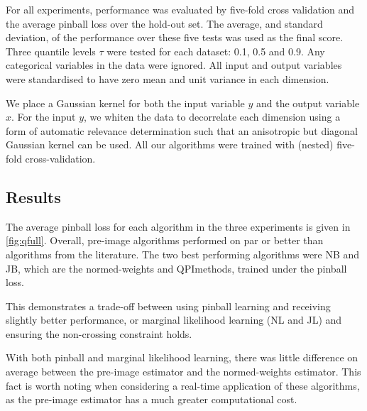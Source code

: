 \documentclass[twoside]{article} \usepackage{aistats2017}
\theoremstyle{definition}
\theoremstyle{theorem}
\newcommand{\qpi}{QPI}
\begin{document}
	For all experiments, performance was evaluated by five-fold cross validation and the average pinball loss over the hold-out set. The average, and standard deviation, of the performance over these five tests was used as the final score. Three quantile levels $\tau$ were tested for each dataset: 0.1, 0.5 and 0.9. Any categorical variables in the data were ignored. All input and output variables were standardised to have zero mean and unit variance in each dimension.
	
	We place a Gaussian kernel for both the input variable $y$ and the output variable $x$. For the input $y$, we whiten the data to decorrelate each dimension using a form of automatic relevance determination \citep{rasmussen2006gaussian} such that an anisotropic but diagonal Gaussian kernel can be used. All our algorithms were trained with (nested) five-fold cross-validation.
%
%
	\subsection{Results}
	\label{sec:experiments:results}
		
%
		
		The average pinball loss for each algorithm in the three experiments is given in \cref{fig:qfull}. Overall, pre-image algorithms performed on par or better than algorithms from the literature. The two best performing algorithms were NB and JB, which are the normed-weights and \qpi\space methods, trained under the pinball loss. %

		This demonstrates a trade-off between using pinball learning and receiving slightly better performance, or marginal likelihood learning (NL and JL) and ensuring the non-crossing constraint holds. %

		With both pinball and marginal likelihood learning, there was little difference on average between the pre-image estimator and the normed-weights estimator. This fact is worth noting when considering a real-time application of these algorithms, as the pre-image estimator has a much greater computational cost.
		
\end{document}
